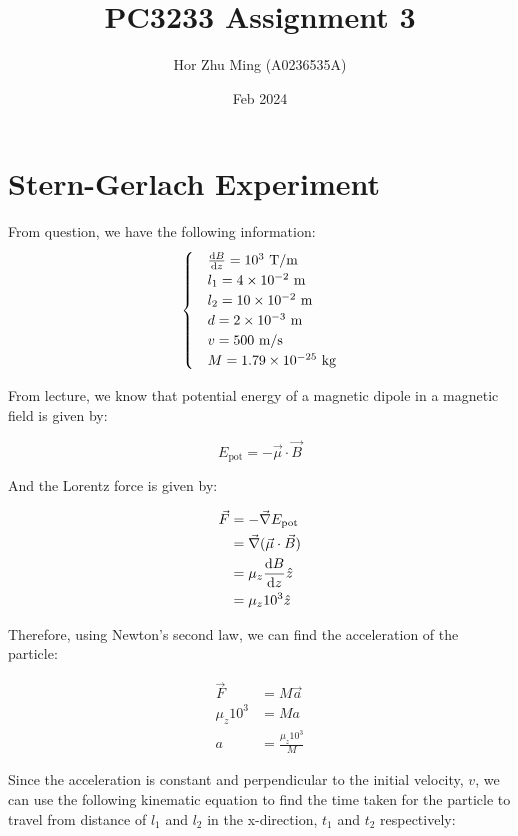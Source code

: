 \documentclass{article}
\title{PC3233 Assignment 3}
\author{Hor Zhu Ming (A0236535A)}
\date{Feb 2024}
\begin{document}
\maketitle

\section{Stern-Gerlach Experiment}

From question, we have the following information:
\begin{equation}
  \begin{cases}
    & \dv{B}{z} = 10^3 \text{ T/m} \\
    & l_1 = 4 \times 10^{-2} \text{ m} \\
    & l_2 = 10 \times 10^{-2} \text{ m} \\
    & d = 2 \times 10^{-3} \text{ m} \\
    & v = 500 \text{ m/s} \\
    & M = 1.79 \times 10^{-25} \text{ kg} \\
  \end{cases}
\end{equation}

From lecture, we know that potential energy of a magnetic dipole in a magnetic field is given by:

\begin{equation}
  E_{\text{pot}} = - \vec{\mu} \cdot \vec{B}
\end{equation}

And the Lorentz force is given by:

\begin{align*}
  \vec{F} 
  &= - \vec{\nabla} E_{\text{pot}} \\
  & = \vec{\nabla} (\vec{\mu} \cdot \vec{B}) \\
  & = \mu_z \dv{B}{z} \hat{z} \\
  & = \mu_z 10^3 \hat{z}
\end{align*}

Therefore, using Newton's second law, we can find the acceleration of the particle:

\begin{align*}
  \vec{F} 
  &= M \vec{a} \\
  \mu_z 10^3 &= M a \\
  a &= \frac{\mu_z 10^3}{M}
\end{align*}

Since the acceleration is constant and perpendicular to the initial velocity, $v$, we can 
use the following kinematic equation to find the time taken for the particle to travel from distance of $l_1$ and $l_2$ in the x-direction, $t_1$ and $t_2$ respectively:
\end{document}
